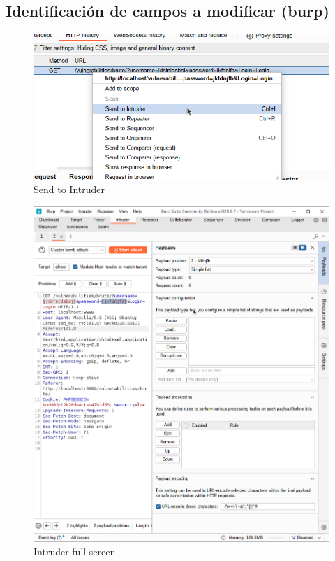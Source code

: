 \documentclass[letterpaper,12pt]{article}
\let\origsubsection\subsection
\renewcommand{\subsection}{\FloatBarrier\origsubsection}
\begin{document}
\subsection{Identificación de campos a modificar (burp)}
\begin{figure}
    \centering
    \includegraphics[width=1\linewidth]{identificaryobtenercamposburp/Captura desde 2025-10-01 23-19-38.png}
    \caption{Send to Intruder}
    \label{fig:sendtointuder}
\end{figure}
\begin{figure}
    \centering
    \includegraphics[width=1\linewidth]{identificaryobtenercamposburp/Captura desde 2025-10-01 23-20-22.png}
    \caption{Intruder full screen}
    \label{fig:intruder}
\end{figure}
\end{document}
